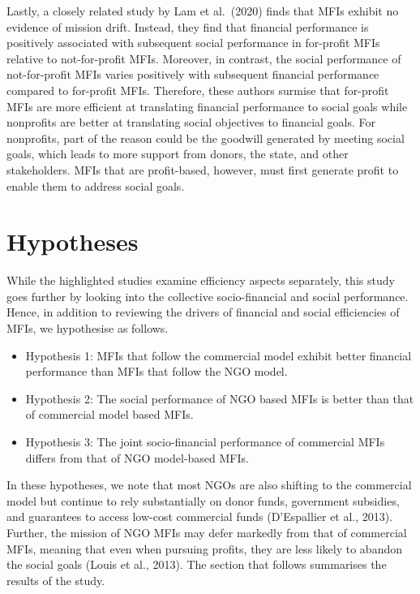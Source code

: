 \documentclass[
]{article}
\providecommand{\tightlist}{%
  \setlength{\itemsep}{0pt}\setlength{\parskip}{0pt}}
\begin{document}
Lastly, a closely related study by Lam et al.~(2020) finds that MFIs
exhibit no evidence of mission drift. Instead, they find that financial
performance is positively associated with subsequent social performance
in for-profit MFIs relative to not-for-profit MFIs. Moreover, in
contrast, the social performance of not-for-profit MFIs varies
positively with subsequent financial performance compared to for-profit
MFIs. Therefore, these authors surmise that for-profit MFIs are more
efficient at translating financial performance to social goals while
nonprofits are better at translating social objectives to financial
goals. For nonprofits, part of the reason could be the goodwill
generated by meeting social goals, which leads to more support from
donors, the state, and other stakeholders. MFIs that are profit-based,
however, must first generate profit to enable them to address social
goals.

\hypertarget{hypotheses}{%
\section{Hypotheses}\label{hypotheses}}

While the highlighted studies examine efficiency aspects separately,
this study goes further by looking into the collective socio-financial
and social performance. Hence, in addition to reviewing the drivers of
financial and social efficiencies of MFIs, we hypothesise as follows.

\begin{itemize}
\tightlist
\item
  Hypothesis 1: MFIs that follow the commercial model exhibit better
  financial performance than MFIs that follow the NGO model.
\item
  Hypothesis 2: The social performance of NGO based MFIs is better than
  that of commercial model based MFIs.
\item
  Hypothesis 3: The joint socio-financial performance of commercial MFIs
  differs from that of NGO model-based MFIs.
\end{itemize}

In these hypotheses, we note that most NGOs are also shifting to the
commercial model but continue to rely substantially on donor funds,
government subsidies, and guarantees to access low-cost commercial funds
(D'Espallier et al., 2013). Further, the mission of NGO MFIs may defer
markedly from that of commercial MFIs, meaning that even when pursuing
profits, they are less likely to abandon the social goals (Louis et al.,
2013). The section that follows summarises the results of the study.
\end{document}
